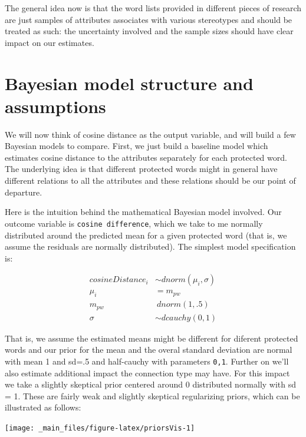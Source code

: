 \documentclass[12pt,]{book}
\begin{document}
The general idea now is that the word lists provided in different pieces
of research are just samples of attributes associates with various
stereotypes and should be treated as such: the uncertainty involved and
the sample sizes should have clear impact on our estimates.

\section{Bayesian model structure and
assumptions}\label{bayesian-model-structure-and-assumptions}

We will now think of cosine distance as the output variable, and will
build a few Bayesian models to compare. First, we just build a baseline
model which estimates cosine distance to the attributes separately for
each protected word. The underlying idea is that different protected
words might in general have different relations to all the attributes
and these relations should be our point of departure.

Here is the intuition behind the mathematical Bayesian model involved.
Our outcome variable is \texttt{cosine\ difference}, which we take to me
normally distributed around the predicted mean for a given protected
word (that is, we assume the residuals are normally distributed). The
simplest model specification is:

\begin{align}
cosineDistance_i  & \sim dnorm(\mu_i, \sigma) \\
\mu_i & = m_{pw} \\
m_{pw} & ~ dnorm(1,.5) \\
\sigma &\sim  dcauchy(0,1)
\end{align}

That is, we assume the estimated means might be different for diferent
protected words and our prior for the mean and the overal standard
deviation are normal with mean 1 and sd=.5 and half-cauchy with
parameters \texttt{0,1}. Further on we'll also estimate additional
impact the connection type may have. For this impact we take a slightly
skeptical prior centered around 0 distributed normally with sd = 1.
These are fairly weak and slightly skeptical regularizing priors, which
can be illustrated as follows:

\vspace{2mm}

\begin{center}\texttt{[image: \_main\_files/figure-latex/priorsVis-1]} \end{center}
\end{document}
